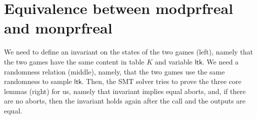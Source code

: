\documentclass[a4paper]{article}
\begin{document}
\section{Equivalence between modprfreal and monprfreal}

\noindent
We need to define an invariant on the states of the two games (left), namely that the two games have the same content in table $K$ and variable $\mathsf{ltk}$. We need a randomness relation (middle), namely, that the two games use the same randomness to sample $\mathsf{ltk}$. Then, the SMT solver tries to prove the three core lemmas (right) for us, namely that invariant implies equal aborts, and, if there are no aborts, then the invariant holds again after the call and the outputs are equal.

\end{document}
